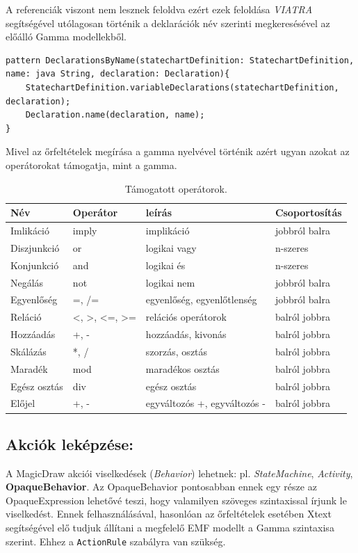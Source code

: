 A referenciák viszont nem lesznek feloldva ezért ezek feloldása \emph{VIATRA} segítségével utólagosan történik a deklarációk név szerinti megkeresésével az előálló Gamma modellekből.
\lstset{style=VQL}
\begin{lstlisting}
pattern DeclarationsByName(statechartDefinition: StatechartDefinition, name: java String, declaration: Declaration){
	StatechartDefinition.variableDeclarations(statechartDefinition, declaration);
	Declaration.name(declaration, name);
}
\end{lstlisting}
 Mivel az őrfeltételek megírása a gamma nyelvével történik azért ugyan azokat az operátorokat támogatja, mint a gamma.

\begin{table}[!h]
	\footnotesize
	\centering
	\begin{tabular}{ l l l l }
		Név & Operátor& leírás & Csoportosítás \\ \hline
		 Imlikáció & imply & implikáció & jobbról balra \\
		 Diszjunkció & or & logikai vagy & n-szeres\\
		 Konjunkció & and & logikai és & n-szeres \\
		 Negálás & not & logikai nem & jobbról balra \\
		 Egyenlőség & =, /= & egyenlőség, egyenlőtlenség & jobbról balra \\
		 Reláció & <, >, <=, >= & relációs operátorok & balról jobbra \\  
		 Hozzáadás & +, - & hozzáadás, kivonás & balról jobbra \\
		 Skálázás & *, / & szorzás, osztás & balról jobbra \\
		 Maradék & mod & maradékos osztás & balról jobbra \\
		 Egész osztás & div & egész osztás & balról jobbra \\
		 Előjel & +, - & egyváltozós +, egyváltozós - & balról jobbra
	\end{tabular}
	\caption{Támogatott operátorok.}
	\label{table:operators}
\end{table}


\subsection{Akciók leképzése:}
A MagicDraw akciói viselkedések (\emph{Behavior}) lehetnek: pl. \emph{StateMachine}, \emph{Activity}, \textbf{OpaqueBehavior}. Az OpaqueBehavior pontosabban ennek egy része az OpaqueExpression lehetővé teszi, hogy valamilyen szöveges szintaxissal írjunk le viselkedést. Ennek felhasználásával, hasonlóan az őrfeltételek esetében Xtext segítségével elő tudjuk állítani a megfelelő EMF modellt a Gamma szintaxisa szerint. Ehhez a \verb+ActionRule+ szabályra van szükség.


